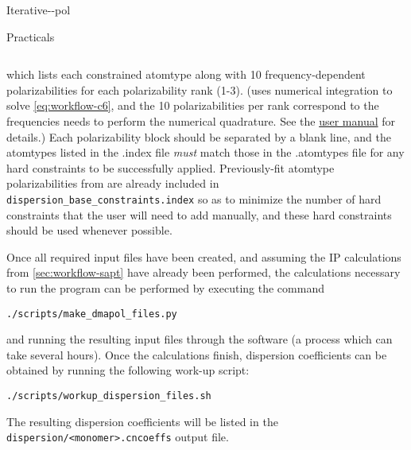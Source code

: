 \begin{subsubsection}{Iterative-\dma-pol}
\begin{paragraph}{Practicals}
\begin{enumerate}
\begin{minipage}{\linewidth}
\begin{lstlisting}
\end{lstlisting}
\end{minipage}
which lists each constrained atomtype along with 10 frequency-dependent
polarizabilities for each polarizability rank (1-3). (\camcasp uses numerical
integration to solve \cref{eq:workflow-c6}, and the 10 polarizabilities per
rank correspond to the frequencies \camcasp needs to perform the numerical
quadrature. See the
\href{http://www-stone.ch.cam.ac.uk/programs/camcasp.html}{\camcasp user
manual} for details.) Each polarizability block should be separated by a blank
line, and the atomtypes listed in the .index file \emph{must} match those in
the .atomtypes file for any hard constraints to be successfully applied. 
Previously-fit atomtype polarizabilities from  are already included in 
\verb|dispersion_base_constraints.index| so as to minimize the number of hard
constraints that the user will need to add manually, and these hard
constraints should be used whenever possible.
\end{enumerate}

Once all required input files have been created, and assuming the IP calculations
from \cref{sec:workflow-sapt} have already been performed,
the \camcasp calculations necessary to run the \idma program
can be performed by executing the command 
%
\begin{lstlisting}
./scripts/make_dmapol_files.py
\end{lstlisting}
%
and running the resulting input files through the \camcasp software (a process
which can take several hours).
Once the \camcasp calculations finish, dispersion coefficients can be obtained by running the following
work-up script:
%
\begin{lstlisting}
./scripts/workup_dispersion_files.sh
\end{lstlisting}
%
The resulting dispersion coefficients will be listed in the
\verb|dispersion/<monomer>.cncoeffs| output file.


\end{paragraph}
\end{subsubsection}
